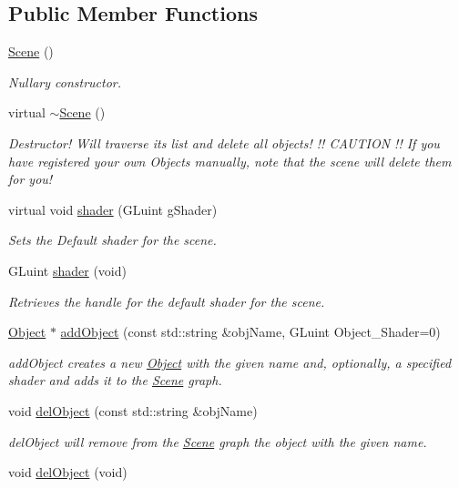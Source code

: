\subsection*{Public Member Functions}
\begin{DoxyCompactItemize}
\item 
\hypertarget{class_scene_ad10176d75a9cc0da56626f682d083507}{\hyperlink{class_scene_ad10176d75a9cc0da56626f682d083507}{Scene} ()}\label{class_scene_ad10176d75a9cc0da56626f682d083507}

\begin{DoxyCompactList}\small\item\em Nullary constructor. \end{DoxyCompactList}\item 
virtual \hyperlink{class_scene_a3b8cec2e32546713915f8c6303c951f1}{$\sim$\-Scene} ()
\begin{DoxyCompactList}\small\item\em Destructor! Will traverse its list and delete all objects! !! C\-A\-U\-T\-I\-O\-N !! If you have registered your own Objects manually, note that the scene will delete them for you! \end{DoxyCompactList}\item 
virtual void \hyperlink{class_scene_a3ea7e92935755c776c235a9872f53394}{shader} (G\-Luint g\-Shader)
\begin{DoxyCompactList}\small\item\em Sets the Default shader for the scene. \end{DoxyCompactList}\item 
G\-Luint \hyperlink{class_scene_a9d8a33f0f0a296aba0fb6717ab85cb18}{shader} (void)
\begin{DoxyCompactList}\small\item\em Retrieves the handle for the default shader for the scene. \end{DoxyCompactList}\item 
\hyperlink{class_object}{Object} $\ast$ \hyperlink{class_scene_aa5a48614e959c38c35d824fa9d6a4b8b}{add\-Object} (const std\-::string \&obj\-Name, G\-Luint Object\-\_\-\-Shader=0)
\begin{DoxyCompactList}\small\item\em add\-Object creates a new \hyperlink{class_object}{Object} with the given name and, optionally, a specified shader and adds it to the \hyperlink{class_scene}{Scene} graph. \end{DoxyCompactList}\item 
void \hyperlink{class_scene_a2a6845dacbb468c5c097c7a6ab5a0fe0}{del\-Object} (const std\-::string \&obj\-Name)
\begin{DoxyCompactList}\small\item\em del\-Object will remove from the \hyperlink{class_scene}{Scene} graph the object with the given name. \end{DoxyCompactList}\item 
\hypertarget{class_scene_a2e6b319b60e27e66ad43bb942a6c4424}{void \hyperlink{class_scene_a2e6b319b60e27e66ad43bb942a6c4424}{del\-Object} (void)}\label{class_scene_a2e6b319b60e27e66ad43bb942a6c4424}


\end{DoxyCompactItemize}
